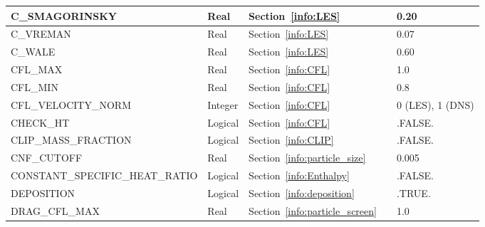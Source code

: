 \documentclass[11pt]{book}
\begin{document}
\begin{longtable}{@{\extracolsep{\fill}}|l|l|l|l|l|}
{\ct C\_SMAGORINSKY}                            & Real          & Section~\ref{info:LES}                                &               & 0.20              \\ \hline
{\ct C\_VREMAN}                                 & Real          & Section~\ref{info:LES}                                &               & 0.07              \\ \hline
{\ct C\_WALE}                                   & Real          & Section~\ref{info:LES}                                &               & 0.60              \\ \hline
{\ct CFL\_MAX}                                  & Real          & Section~\ref{info:CFL}                                &               & 1.0               \\ \hline
{\ct CFL\_MIN}                                  & Real          & Section~\ref{info:CFL}                                &               & 0.8               \\ \hline
{\ct CFL\_VELOCITY\_NORM}                       & Integer       & Section~\ref{info:CFL}                                &               & 0 (LES), 1 (DNS)  \\ \hline
{\ct CHECK\_HT}                                 & Logical       & Section~\ref{info:CFL}                                &               & {\ct .FALSE.}     \\ \hline
{\ct CLIP\_MASS\_FRACTION}                      & Logical       & Section~\ref{info:CLIP}                               &               & {\ct .FALSE.}     \\ \hline
{\ct CNF\_CUTOFF}                               & Real          & Section~\ref{info:particle_size}                      &               & 0.005             \\ \hline
{\ct \footnotesize CONSTANT\_SPECIFIC\_HEAT\_RATIO}  & Logical  & Section~\ref{info:Enthalpy}                           &               & {\ct .FALSE.}     \\ \hline
{\ct DEPOSITION}                                & Logical       & Section~\ref{info:deposition}                         &               & {\ct .TRUE.}      \\ \hline
{\ct DRAG\_CFL\_MAX}                            & Real          & Section~\ref{info:particle_screen}                    &               &   1.0               \\ \hline

\end{longtable}
\end{document}
